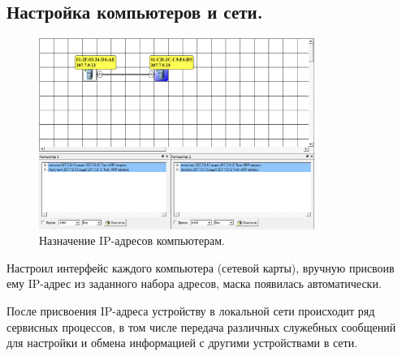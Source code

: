 \documentclass[12pt,onecolumn]{article}
\begin{document}
\subsection{Настройка компьютеров и сети.}
\begin{figure}[H]
  \centering
  \includegraphics[width=0.8\textwidth]{image/ip-addresses.png}
  \caption{Назначение IP-адресов компьютерам.}
\end{figure}

Настроил интерфейс каждого компьютера (сетевой карты), вручную присвоив ему IP-адрес из заданного набора адресов, маска появилась автоматически.

После присвоения IP-адреса устройству в локальной сети происходит ряд сервисных процессов, в том числе передача различных служебных сообщений для настройки и обмена информацией с другими устройствами в сети.
\end{document}
